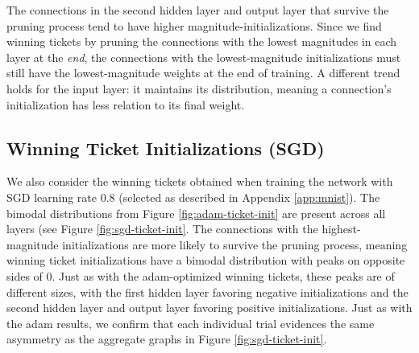 The connections in the second hidden layer and output layer that survive the pruning process
tend to have higher magnitude-initializations.
Since we find winning tickets by pruning the connections with the lowest magnitudes in each layer at the \emph{end},
the connections with the lowest-magnitude initializations must still have the lowest-magnitude weights at the end of training.
A different trend holds for the input layer: it maintains its distribution, meaning a connection's initialization has less relation
to its final weight.

\subsection{Winning Ticket Initializations (SGD)}

We also consider the winning tickets obtained when training the network with SGD learning rate 0.8 (selected as described in Appendix \ref{app:mnist}).
The bimodal distributions from Figure
\ref{fig:adam-ticket-init} are present across all layers (see Figure \ref{fig:sgd-ticket-init}.
The connections with the highest-magnitude initializations are more likely to survive the pruning process, meaning winning ticket
initializations have a bimodal distribution with peaks on opposite sides of 0. Just as with the adam-optimized winning tickets, these
peaks are of different sizes, with the first hidden layer favoring negative initializations and the second hidden layer and output layer
favoring positive initializations. Just as with the adam results, we confirm that each individual trial evidences the same
asymmetry as the aggregate graphs in Figure \ref{fig:sgd-ticket-init}.


